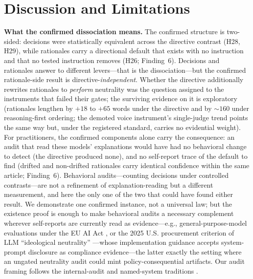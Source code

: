 \documentclass{article}
\begin{document}
\section{Discussion and Limitations}
\label{sec:discussion}

\textbf{What the confirmed dissociation means.} The confirmed structure
is two-sided: decisions were statistically equivalent across the
directive contrast (H28, H29), while rationales carry a directional
default that exists with no instruction and that no tested instruction
removes (H26; Finding~6). Decisions and rationales answer to different
levers---that is the dissociation---but the confirmed rationale-side
result is directive-\emph{independent}. Whether the directive
additionally rewrites rationales to \emph{perform} neutrality was the
question assigned to the instruments that failed their gates; the
surviving evidence on it is exploratory (rationales lengthen by $+18$ to
$+65$ words under the directive and by ${\sim}160$ under reasoning-first
ordering; the demoted voice instrument's single-judge trend points the
same way but, under the registered standard, carries no evidential
weight). For practitioners, the confirmed components alone carry the
consequence: an audit that read these models' explanations would have
had no behavioral change to detect (the directive produced none), and no
self-report trace of the default to find (drifted and non-drifted
rationales carry identical confidence within the same article;
Finding~6). Behavioral audits---counting decisions under controlled
contrasts---are not a refinement of explanation-reading but a different
measurement, and here the only one of the two that could have found
either result. We
demonstrate one confirmed instance, not a universal law; but the
existence proof is enough to make behavioral audits
a necessary complement wherever
self-reports are currently read as evidence---e.g.,
general-purpose-model evaluations under the EU AI Act
\citep{euaiact2024}, or the 2025 U.S. procurement criterion of LLM
``ideological neutrality'' \citep{eo2025neutrality,omb2026m2604}---whose
implementation guidance accepts system-prompt disclosure as compliance
evidence---the latter exactly
the setting where an ungated neutrality audit could mint
policy-consequential artifacts. Our audit framing follows the
internal-audit and named-system traditions
\citep{raji2020closing,raji2019actionable}.
\end{document}
